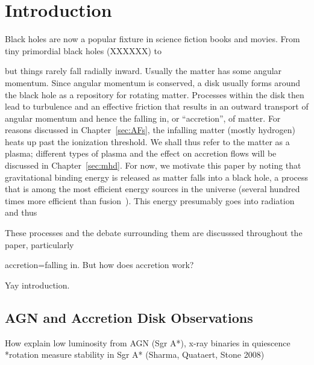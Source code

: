 \chapter{Introduction}
Black holes are now a popular fixture in science fiction books and movies. From tiny primordial black holes (XXXXXX) to 

but things rarely fall radially inward. Usually the matter has some angular momentum. Since angular momentum is conserved, a disk usually forms around the black hole as a repository for rotating matter. Processes within the disk then lead to turbulence and an effective friction that results in an outward transport of angular momentum and hence the falling in, or ``accretion'', of matter. For reasons discussed in Chapter~\ref{sec:AFs}, the infalling matter (mostly hydrogen) heats up past the ionization threshold. We shall thus refer to the matter as a plasma; different types of plasma and the effect on accretion flows will be discussed in Chapter~\ref{sec:mhd}. For now, we motivate this paper by noting that gravitational binding energy is released as matter falls into a black hole, a process that is among the most efficient energy sources in the universe (several hundred times more efficient than fusion~\cite{Blandford1999}). This energy presumably goes into radiation and thus 

These processes and the debate surrounding them are discusssed throughout the paper, particularly 

accretion=falling in. But how does accretion work?

Yay introduction.
\section{AGN and Accretion Disk Observations}
How explain low luminosity from AGN (Sgr A*), x-ray binaries in quiescence
*rotation measure  stability in Sgr A* (Sharma, Quataert, Stone 2008)
 
